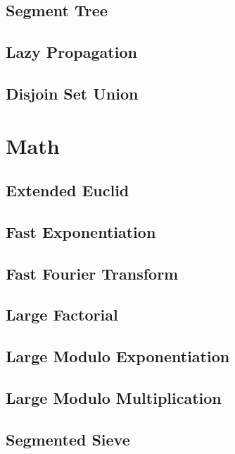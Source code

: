 \subsection{Segment Tree}
\raggedbottom
\hrulefill
\subsection{Lazy Propagation}
\raggedbottom
\hrulefill
\subsection{Disjoin Set Union}
\raggedbottom
\hrulefill

\section{Math}
\subsection{Extended Euclid}
\raggedbottom
\hrulefill
\subsection{Fast Exponentiation}
\raggedbottom
\hrulefill
\subsection{Fast Fourier Transform}
\raggedbottom
\hrulefill
\subsection{Large Factorial}
\raggedbottom
\hrulefill
\subsection{Large Modulo Exponentiation}
\raggedbottom
\hrulefill
\subsection{Large Modulo Multiplication}
\raggedbottom
\hrulefill
\subsection{Segmented Sieve}
\raggedbottom
\hrulefill

